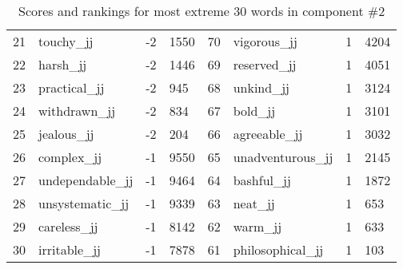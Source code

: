 \begin{table}[tbp]
\begin{tabular}{| rlr@{.}l | rlr@{.}l |}
    21 & touchy\_jj & -2 & 1550    &    70 & vigorous\_jj & 1 & 4204 \\
    22 & harsh\_jj & -2 & 1446    &    69 & reserved\_jj & 1 & 4051 \\
    23 & practical\_jj & -2 & 945    &    68 & unkind\_jj & 1 & 3124 \\
    24 & withdrawn\_jj & -2 & 834    &    67 & bold\_jj & 1 & 3101 \\
    25 & jealous\_jj & -2 & 204    &    66 & agreeable\_jj & 1 & 3032 \\
    26 & complex\_jj & -1 & 9550    &    65 & unadventurous\_jj & 1 & 2145 \\
    27 & undependable\_jj & -1 & 9464    &    64 & bashful\_jj & 1 & 1872 \\
    28 & unsystematic\_jj & -1 & 9339    &    63 & neat\_jj & 1 & 653 \\
    29 & careless\_jj & -1 & 8142    &    62 & warm\_jj & 1 & 633 \\
    30 & irritable\_jj & -1 & 7878    &    61 & philosophical\_jj & 1 & 103 \\
    \hline
    \end{tabular}
    \caption{Scores and rankings for most extreme 30 words in component \#2} 
\end{table}
\clearpage
